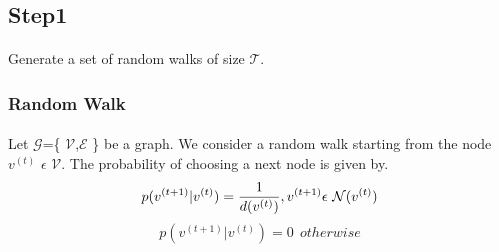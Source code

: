 \subsection{Step1}
    \paragraph{} Generate a set of random walks of size $\mathcal{T}$.
\subsubsection{Random Walk}
    \paragraph{}Let $\mathcal{G}$=\{ $\mathcal{V}$,$\mathcal{E}$ \} be a graph. We consider a random walk starting from the node $v^{(t)}$ $\epsilon$ $\mathcal{V}$. 
    The probability of choosing a next node is given by.
    \begin{equation}
        p(v^{(t+1)}|v^{(t)}) = \frac{1}{d(v^{(t)})}, v ^{(t+1)} \epsilon \ \mathcal{N}(v^{(t)}) \\
    \end{equation}
    \begin{equation}
        p(v^{(t+1)}|v^{(t)}) = 0 \ \ otherwise
    \end{equation}
